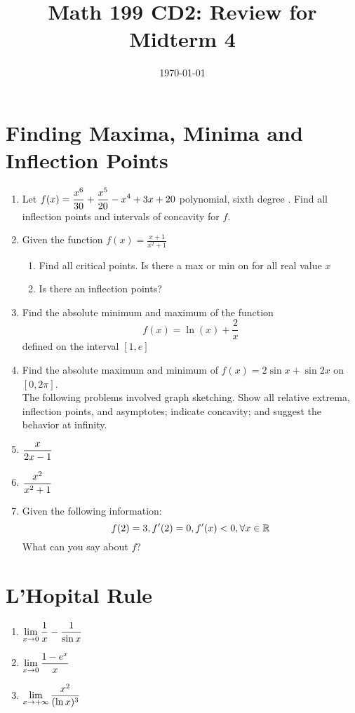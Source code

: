 




\title{Math 199 CD2: Review for Midterm 4}
\date{\today}



	
	\maketitle
	
	
	\section{Finding Maxima, Minima and Inflection Points}
	\begin{enumerate}
		\item Let $\displaystyle f(x)=\frac{x^6}{30}+\frac{x^5}{20}-x^4+3x+20$ polynomial, sixth degree . Find all inflection points and intervals of concavity for $f$.
		\vskip 5cm
		\item Given the function $f(x)=\frac{x+1}{x^2+1}$
		\begin{enumerate}
			\item Find all critical points. Is there a max or min on for all real value $x$
			\item Is there an inflection points?
			\vskip 6cm
		\end{enumerate}

		\item Find the absolute minimum and maximum of the function 
		$$f(x)=\ln(x) +\frac{2}{x}$$
		defined on the interval $[1,e]$
		\vskip 6cm

		\item Find the absolute maximum and minimum of $f(x) = 2\sin x + \sin2x$ on $[0,2\pi]$.\\
		\vskip 6cm
		The following problems involved graph sketching. Show all relative extrema, inflection points, and asymptotes; indicate concavity; and suggest the behavior at infinity.
		\item $\displaystyle \frac{x}{2x-1}$
		\vskip 4cm
		\item $\displaystyle \frac{x^2}{x^2+1}$
		\vskip 4cm
		\item Given the following information: 
		$$f(2) = 3, f'(2) = 0, f'(x)<0, \forall x \in \mathbb{R}$$
		What can you say about $f$?
		\vskip 4cm
	\end{enumerate}
	\section{L'Hopital Rule}
	\begin{enumerate}
		\item $\displaystyle \lim_{x \to 0}\frac{1}{x}-\frac{1}{\sin x}$
		\vskip 4cm
		\item $\displaystyle \lim_{x \to 0}\frac{1-e^x}{x}$
		\vskip 4cm
		\item $\displaystyle \lim_{x \to +\infty}\frac{x^2}{(\ln x)^3}$
		\vskip 4cm
	\end{enumerate}

